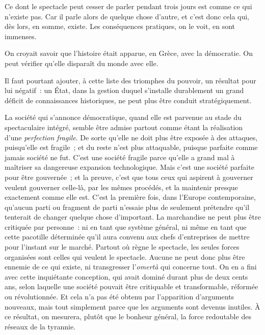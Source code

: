 \documentclass[french,twoside]{book} %
\def\mednobreak{\ifdim\lastskip<\medskipamount
  \removelastskip\nopagebreak\medskip\fi}
\newcommand{\labelblock}[1]{\medbreak{\noindent\color{rubric}\bfseries #1}\par\mednobreak}
\begin{document}
Ce dont le spectacle peut cesser de parler pendant trois jours est comme ce qui n’existe pas. Car il parle alors de quelque chose d’autre, et c’est donc cela qui, dès lors, en somme, existe. Les conséquences pratiques, on le voit, en sont immenses.\par
On croyait savoir que l’histoire était apparue, en Grèce, avec la démocratie. On peut vérifier qu’elle disparaît du monde avec elle.\par
Il faut pourtant ajouter, à cette liste des triomphes du pouvoir, un résultat pour lui négatif : un État, dans la gestion duquel s’installe durablement un grand déficit de connaissances historiques, ne peut plus être conduit stratégiquement.\par

\labelblock{VIII}

\noindent La société qui s’annonce démocratique, quand elle est parvenue au stade du spectaculaire intégré, semble être admise partout comme étant la réalisation d’une \emph{perfection fragile}. De sorte qu’elle ne doit plus être exposée à des attaques, puisqu’elle est fragile ; et du reste n’est plus attaquable, puisque parfaite comme jamais société ne fut. C’est une société fragile parce qu’elle a grand mal à maîtriser sa dangereuse expansion technologique. Mais c’est une société parfaite pour être gouvernée ; et la preuve, c’est que tous ceux qui aspirent à gouverner veulent gouverner celle-là, par les mêmes procédés, et la maintenir presque exactement comme elle est. C’est la première fois, dans l’Europe contemporaine, qu’aucun parti ou fragment de parti n’essaie plus de seulement prétendre qu’il tenterait de changer quelque chose d’important. La marchandise ne peut plus être critiquée par personne : ni en tant que système général, ni même en tant que cette pacotille déterminée qu’il aura convenu aux chefs d’entreprises de mettre pour l’instant sur le marché. Partout où règne le spectacle, les seules forces organisées sont celles qui veulent le spectacle. Aucune ne peut donc plus être ennemie de ce qui existe, ni transgresser l’\emph{omertà} qui concerne tout. On en a fini avec cette inquiétante conception, qui avait dominé durant plus de deux cents ans, selon laquelle une société pouvait être critiquable et transformable, réformée ou révolutionnée. Et cela n’a pas été obtenu par l’apparition d’arguments nouveaux, mais tout simplement parce que les arguments sont devenus inutiles. À ce résultat, on mesurera, plutôt que le bonheur général, la force redoutable des réseaux de la tyrannie.\par
\end{document}
